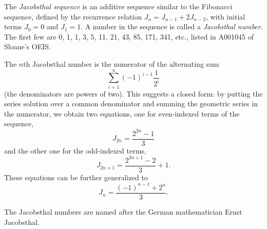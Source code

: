 \documentclass[12pt]{article}
\begin{document}
The {\em Jacobsthal sequence} is an additive sequence similar to the Fibonacci sequence, defined by the recurrence relation $J_n = J_{n - 1} + 2J_{n - 2}$, with initial terms $J_0 = 0$ and $J_1 = 1$. A number in the sequence is called a {\em Jacobsthal number}. The first few are 0, 1, 1, 3, 5, 11, 21, 43, 85, 171, 341, etc., listed in A001045 of Sloane's OEIS.

The $n$th Jacobsthal number is the numerator of the alternating sum $$\sum_{i = 1}^n (-1)^{i - 1} \frac{1}{2^i}$$ (the denominators are powers of two). This suggests a closed form: by putting the series solution over a common denominator and summing the geometric series in the numerator, we obtain two equations, one for even-indexed terms of the sequence, $$J_{2n} = \frac{2^{2n} - 1}{3}$$ and the other one for the odd-indexed terms, $$J_{2n + 1} = \frac{2^{2n + 1} - 2}{3} + 1.$$ These equations can be further generalized to $$J_n = \frac{(-1)^{n - 1} + 2^n}{3}.$$

The Jacobsthal numbers are named after the German mathematician Ernst Jacobsthal.


\end{document}
